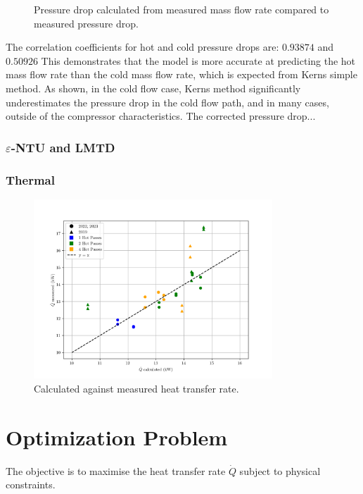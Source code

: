 \documentclass{article}
\begin{document}
\begin{figure}[H]
  \caption{Pressure drop calculated from measured mass flow rate compared to measured pressure drop.}
  \label{fig:pressure_drops}

\end{figure}

The correlation coefficients for hot and cold pressure drops are:  $\mathbf{0.93874}$ and $\mathbf{0.50926}$
This demonstrates that the model is more accurate at predicting the hot mass flow rate than the cold mass flow rate,
which is expected from Kerns simple method.
As shown, in the cold flow case, Kerns method significantly underestimates the pressure drop in the cold flow path, and in many cases, outside of the compressor characteristics.
The corrected pressure drop...

\subsubsection{$\varepsilon$-NTU and LMTD}

\subsubsection{Thermal}

\begin{figure}[H]
  \centering
  \includegraphics[width=0.8\textwidth]{Qdot_ccalc_vs_measured.png}
  \caption{Calculated against measured heat transfer rate.}
\end{figure}

\section{Optimization Problem}

The objective is to maximise the heat transfer rate $\dot{Q}$ subject to physical constraints.
\end{document}
